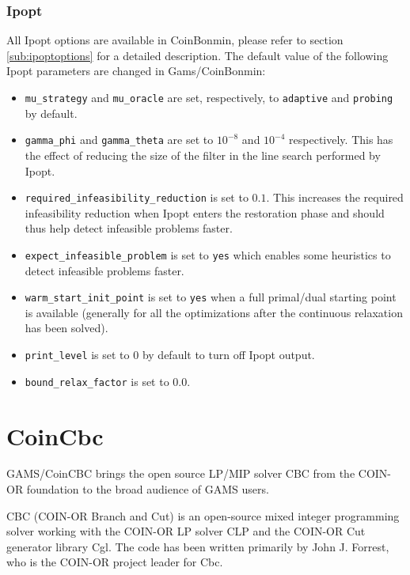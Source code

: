 

\subsubsection{Ipopt}
All Ipopt options are available in CoinBonmin, please refer to section \ref{sub:ipoptoptions} for a detailed description.
The default value of the following Ipopt parameters are changed in Gams/CoinBonmin:
\begin{itemize}
\item \texttt{mu\_strategy} and \texttt{mu\_oracle} are set, respectively, to {\tt adaptive} and {\tt probing} by default.
\item \texttt{gamma\_phi} and \texttt{gamma\_theta} are set to $10^{-8}$ and $10^{-4}$ respectively. This has the effect of reducing the size of the filter in the line search performed by Ipopt.
\item \texttt{required\_infeasibility\_reduction} is set to $0.1$.
This increases the required infeasibility reduction when Ipopt enters the restoration phase and should thus help
detect infeasible problems faster.
\item \texttt{expect\_infeasible\_problem} is set to {\tt yes} which enables some heuristics to detect infeasible problems faster.
\item \texttt{warm\_start\_init\_point} is set to {\tt yes} when a full primal/dual starting point is available (generally for all the optimizations after the continuous relaxation has been solved).
\item \texttt{print\_level} is set to $0$ by default to turn off Ipopt output.
\item \texttt{bound\_relax\_factor} is set to $0.0$.
\end{itemize}

\section{CoinCbc}
\label{sec:coincbc}
\hypertarget{sec:coincbc}{}

GAMS/CoinCBC brings the open source LP/MIP solver CBC from the COIN-OR foundation to the broad audience of GAMS users.

CBC (COIN-OR Branch and Cut) is an open-source mixed integer programming solver working with the COIN-OR LP solver CLP and the COIN-OR Cut generator library Cgl.
The code has been written primarily by John J. Forrest, who is the COIN-OR project leader for Cbc.

